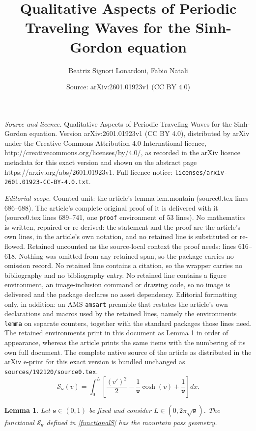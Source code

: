 \documentclass[10pt,a4paper]{amsart}
\title{Qualitative Aspects of Periodic Traveling Waves for the Sinh-Gordon equation}
\author{Beatriz Signori Lonardoni, Fabio Natali}
\date{Source: arXiv:2601.01923v1 (CC BY 4.0)}
\newtheorem{lemma}{Lemma}
\begin{document}
\maketitle

\noindent\emph{Source and licence.} Qualitative Aspects of Periodic Traveling Waves for the Sinh-Gordon equation. Version arXiv:2601.01923v1 (CC BY 4.0), distributed by arXiv under the Creative Commons Attribution 4.0 International licence, http://creativecommons.org/licenses/by/4.0/, as recorded in the arXiv licence metadata for this exact version and shown on the abstract page https://arxiv.org/abs/2601.01923v1. Full licence notice: \texttt{licenses/arxiv-2601.01923-CC-BY-4.0.txt}.\par\smallskip

\noindent\textit{Editorial scope.} Counted unit: the article's lemma lem.montain (source0.tex lines 686--688). The article's complete original proof of it is delivered with it (source0.tex lines 689--741, one \texttt{proof} environment of 53 lines). No mathematics is written, repaired or re-derived: the statement and the proof are the article's own lines, in the article's own notation, and no retained line is substituted or re-flowed.  Retained uncounted as the source-local context the proof needs: lines 616--618.  Nothing was omitted from any retained span, so the package carries no omission record.  No retained line contains a citation, so the wrapper carries no bibliography and no bibliography entry.  No retained line contains a figure environment, an image-inclusion command or drawing code, so no image is delivered and the package declares no asset dependency.  Editorial formatting only, in addition: an AMS \texttt{amsart} preamble that restates the article's own declarations and macros used by the retained lines, namely the environments \texttt{lemma} on separate counters, together with the standard packages those lines need.  The retained environments print in this document as Lemma 1 in order of appearance, whereas the article prints the same items with the numbering of its own full document.  The complete native source of the article as distributed in the arXiv e-print for this exact version is bundled unchanged as \texttt{sources/192120/source0.tex}.
 \begin{equation}\label{functionalS}
 	\mathcal{S}_\mathtt{w}(v)= \int_{0}^{L}\left[ \frac{(v')^2}{2}-\frac{1}{\mathtt{w}} \cosh(v) +\frac{1}{\mathtt{w}}\right]dx.
 \end{equation}

 \begin{lemma}\label{lem.montain}
Let $\mathtt{w}\in(0,1)$ be fixed and  consider  $L\in(0,2\pi \sqrt{\mathtt{w}})$. The functional $\mathcal{S}_\mathtt{w}$ defined in \eqref{functionalS} has the mountain pass geometry. 
 \end{lemma}
\end{document}
